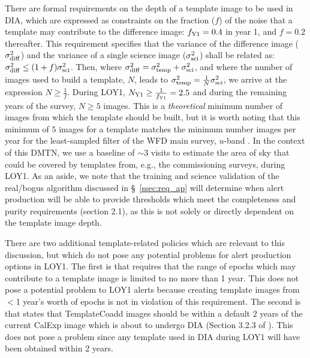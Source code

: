 \documentclass[DM,lsstdraft,toc]{lsstdoc}
\begin{document}
There are formal requirements on the depth of a template image to be used in DIA, which are expressed as constraints on the fraction ($f$) of the noise that a template may contribute to the difference image: $f_{\rm Y1}=0.4$ in year 1, and $f=0.2$ thereafter.
This requirement specifies that the variance of the difference image ($\sigma_{\rm diff}^2$) and the variance of a single science image ($\sigma_{\rm sci}^2$) shall be related as: $\sigma_{\rm diff}^2 \leq (1+f)\sigma_{\rm sci}^2$.
Then, where $\sigma_{\rm diff}^2 = \sigma_{\rm temp}^2 + \sigma_{\rm sci}^2$, and where the number of images used to build a template, $N$, leads to $\sigma_{\rm temp}^2 = \frac{1}{N} \sigma_{\rm sci}^2$, we arrive at the expression $N \geq \frac{1}{f}$.
During LOY1, $N_{\rm Y1} \geq \frac{1}{f_{\rm Y1}} = 2.5$ and during the remaining years of the survey, $N \geq 5$ images.
This is a {\em theoretical} minimum number of images from which the template should be built, but it is worth noting that this minimum of $5$ images for a template matches the minimum number images per year for the least-sampled filter of the WFD main survey, $u$-band \citep{Ivezi__2019}.
In the context of this DMTN, we use a baseline of $\sim$3 visits to estimate the area of sky that could be covered by templates from, e.g., the commissioning surveys, during LOY1.
As an aside, we note that the training and science validation of the real/bogus algorithm discussed in \S~\ref{ssec:req_ap} will determine when alert production will be able to provide thresholds which meet the completeness and purity requirements (section 2.1), as this is not solely or directly dependent on the template image depth.


There are two additional template-related policies which are relevant to this discussion, but which do not pose any potential problems for alert production options in LOY1.
The first is that  requires that the range of epochs which may contribute to a template image is limited to no more than 1 year.
This does not pose a potential problem to LOY1 alerts because creating template images from $<$1 year's worth of epochs is not in violation of this requirement.
The second is that  states that TemplateCoadd images should be within a default $2$ years of the current CalExp image which is about to undergo DIA (Section 3.2.3 of \cite{LDM-151}).
This does not pose a problem since any template used in DIA during LOY1 will have been obtained within 2 years.
\end{document}
